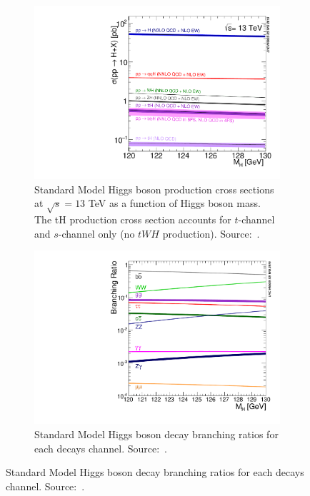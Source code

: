 

\begin{figure}[htbp]
  \centering
  \begin{subfigure}[htbp]{0.48\textwidth}
    \centering
    \includegraphics[width=\textwidth]{figures_and_tables/theory/higgs_prod_modes.pdf}
    \caption{  Standard Model Higgs boson production cross sections at $\sqrt{s}=13$ TeV as a function of Higgs boson mass. The tH production cross section accounts for $t$-channel and $s$-channel only (no $tWH$ production). Source:~\cite{deFlorian:2016spz}.}
  \label{higgs_prod_modes}
  \end{subfigure}
  \hfill
  \begin{subfigure}[htbp]{0.48\textwidth}
    \centering
    \includegraphics[width=\textwidth]{figures_and_tables/theory/higgs_decays.pdf}
    \caption{ Standard Model Higgs boson decay branching ratios for each decays channel. Source:~\cite{deFlorian:2016spz}.}
    \label{higgs_decays}
  \end{subfigure}
\end{figure}


